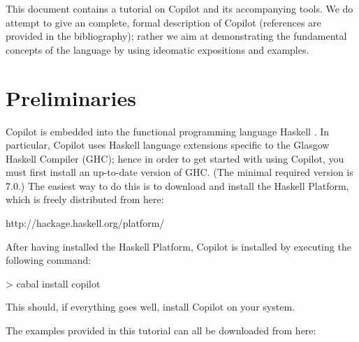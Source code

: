 \documentclass[a4paper, 10pt]{article}
\newcommand{\todo}[1]{\textcolor{blue}{\fbox{TODO: #1}}}
\theoremstyle{example}
\begin{document}



{
\small
This document contains a tutorial on Copilot and its accompanying tools.
We do attempt to give an complete, formal description of Copilot
(references are provided in the bibliography); rather we aim at
demonstrating the fundamental concepts of the language by using ideomatic
expositions and examples.
}

{
\small
\setcounter{tocdepth}{2}
\tableofcontents
}

\newpage

\section{Preliminaries}

Copilot is embedded into the functional programming language Haskell
\citep{PeytonJones02}. In particular, Copilot uses Haskell language extensions
specific to the Glasgow Haskell Compiler (GHC); hence in order to get started
with using Copilot, you must first install an up-to-date version of GHC.
(The minimal required version is 7.0.)
The easiest way to do this is to download and install the Haskell Platform,
which is freely distributed from here:

\begin{center}
http://hackage.haskell.org/platform/
\end{center}

After having installed the Haskell Platform, Copilot is installed by executing
the following command:

\begin{code}
> cabal install copilot
\end{code}

\noindent This should, if everything goes well, install Copilot on your system.

The examples provided in this tutorial can all be downloaded from here:

\begin{center}
\todo{http://github...}
\end{center}
\end{document}
